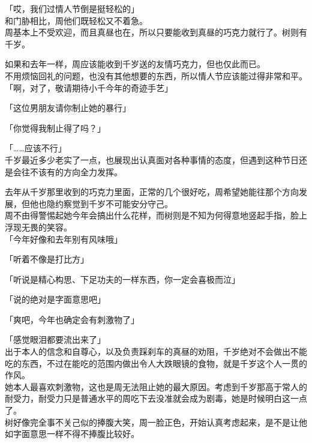 「哎，我们过情人节倒是挺轻松的」\\

和门胁相比，周他们既轻松又不着急。\\

周基本上不受欢迎，而且真昼也在，所以只要能收到真昼的巧克力就行了。树则有千岁。

如果和去年一样，周应该能收到千岁送的友情巧克力，但也仅此而已。\\

不用烦恼回礼的问题，也没有其他想要的东西，所以情人节应该能过得非常和平。\\

「啊，对了，敬请期待小千今年的奇迹手艺」

「这位男朋友请你制止她的暴行」

「你觉得我制止得了吗？」

「……应该不行」\\

千岁最近多少老实了一点，也展现出认真面对各种事情的态度，但遇到这种节日还是会往不该有的方向全力发挥。

去年从千岁那里收到的巧克力里面，正常的几个很好吃，周希望她能往那个方向发展，但他也隐约察觉到千岁不可能安分守己。\\

周不由得警惕起她今年会搞出什么花样，而树则是不知为何得意地竖起手指，脸上浮现无畏的笑容。\\

「今年好像和去年别有风味哦」

「听着不像是打比方」

「听说是精心构思、下足功夫的一样东西，你一定会喜极而泣」

「说的绝对是字面意思吧」

「爽吧，今年也确定会有刺激物了」

「感觉眼泪都要流出来了」\\

出于本人的信念和自尊心，以及负责踩刹车的真昼的劝阻，千岁绝对不会做出不能吃的东西，不过在能吃的范围内做出令人大跌眼镜的食物，就是千岁这个人一贯的作风。\\

她本人最喜欢刺激物，这也是周无法阻止她的最大原因。考虑到千岁那高于常人的耐受力，耐受力只是普通水平的周吃下去没准就会成为剧毒，她是时候明白这一点了。\\

树好像完全事不关己似的捧腹大笑，周一脸正色，开始认真考虑起来，是不是让他如字面意思一样不得不捧腹比较好。\\

